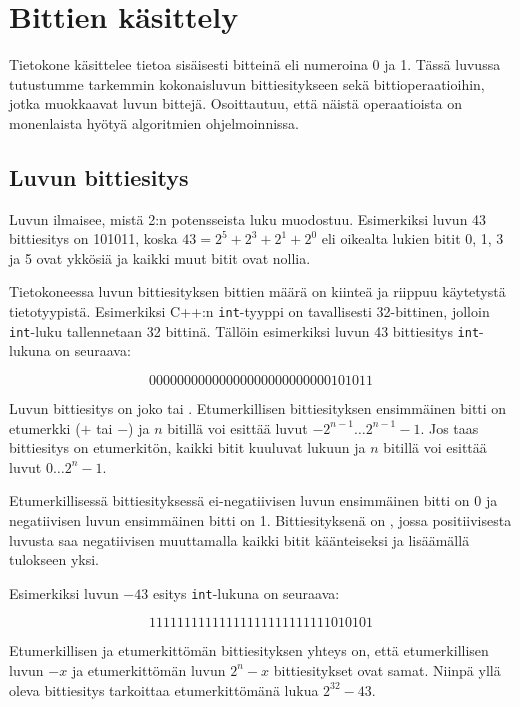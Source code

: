 \chapter{Bittien käsittely}

Tietokone käsittelee tietoa sisäisesti bitteinä
eli numeroina 0 ja 1.
Tässä luvussa tutustumme tarkemmin kokonaisluvun
bittiesitykseen sekä bittioperaatioihin,
jotka muokkaavat luvun bittejä.
Osoittautuu, että näistä operaatioista on
monenlaista hyötyä algoritmien ohjelmoinnissa.

\section{Luvun bittiesitys}


Luvun  ilmaisee, mistä 2:n potensseista
luku muodostuu. Esimerkiksi luvun 43 bittiesitys on 101011, koska
$43 = 2^5 + 2^3 + 2^1 + 2^0$
eli oikealta lukien bitit 0, 1, 3 ja 5 ovat ykkösiä
ja kaikki muut bitit ovat nollia.

Tietokoneessa luvun bittiesityksen
bittien määrä on kiinteä ja riippuu käytetystä tietotyypistä.
Esimerkiksi C++:n \texttt{int}-tyyppi on tavallisesti 32-bittinen,
jolloin \texttt{int}-luku tallennetaan 32 bittinä.
Tällöin esimerkiksi luvun 43 bittiesitys \texttt{int}-lukuna on seuraava:

\[00000000000000000000000000101011\]

Luvun bittiesitys on joko 
tai .
Etumerkillisen bittiesityksen ensimmäinen bitti on etumerkki
($+$ tai $-$) ja $n$ bitillä voi esittää luvut $-2^{n-1} \ldots 2^{n-1}-1$.
Jos taas bittiesitys on etumerkitön,
kaikki bitit kuuluvat lukuun ja $n$ bitillä voi esittää luvut $0 \ldots 2^n-1$.

Etumerkillisessä bittiesityksessä ei-negatiivisen luvun
ensimmäinen bitti on 0 ja negatiivisen luvun
ensimmäinen bitti on 1.
Bittiesityksenä on ,
jossa positiivisesta luvusta saa negatiivisen muuttamalla
kaikki bitit käänteiseksi ja lisäämällä
tulokseen yksi.

Esimerkiksi luvun $-43$ esitys \texttt{int}-lukuna on seuraava:

\[11111111111111111111111111010101\]

Etumerkillisen ja etumerkittömän bittiesityksen
yhteys on, että etumerkillisen luvun $-x$
ja etumerkittömän luvun $2^n-x$ bittiesitykset ovat samat.
Niinpä yllä oleva bittiesitys tarkoittaa
etumerkittömänä lukua $2^{32}-43$.

